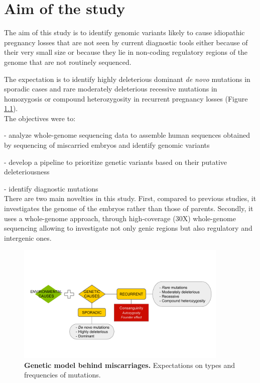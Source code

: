 
\chapter{Aim of the study} %

\label{Chapter2} %


\newcommand{\keyword}[1]{\textbf{#1}}
\newcommand{\tabhead}[1]{\textbf{#1}}
\newcommand{\code}[1]{\texttt{#1}}
\newcommand{\file}[1]{\texttt{\bfseries#1}}
\newcommand{\option}[1]{\texttt{\itshape#1}}


The aim of this study is to identify genomic variants likely to cause idiopathic pregnancy losses that are not seen by current diagnostic tools either because of their very small size or because they lie in non-coding regulatory regions of the genome that are not routinely sequenced.

The expectation is to identify highly deleterious dominant \textit{de novo} mutations in sporadic cases and rare moderately deleterious recessive mutations in homozygosis or compound heterozygosity in recurrent pregnancy losses (Figure \ref{fig:expectation}).\\

The objectives were to: 

- analyze whole-genome sequencing data to assemble human sequences obtained by sequencing of miscarried embryos and identify genomic variants

- develop a pipeline to prioritize genetic variants based on their putative deleteriousness  

- identify diagnostic mutations\\

There are two main novelties in this study. First, compared to previous studies, it investigates the genome of the embryos rather than those of parents. Secondly, it uses a whole-genome approach, through high-coverage (30X) whole-genome sequencing allowing to investigate not only genic regions but also regulatory and intergenic ones.

\begin{figure}[H]
\centering
\includegraphics[width=0.90\textwidth]{fig/expectation.png}
\decoRule
\caption{\textbf{Genetic model behind miscarriages.} Expectations on types and frequencies of mutations.} 
\label{fig:expectation}
\end{figure}